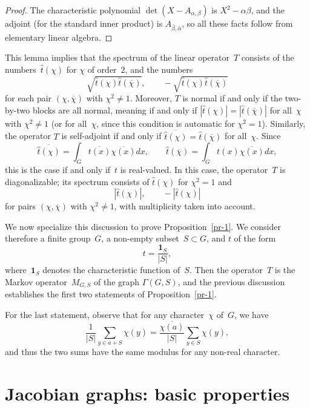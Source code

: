 \documentclass[12pt]{amsart}
\numberwithin{equation}{section}
\theoremstyle{plain}
\theoremstyle{remark}
\theoremstyle{definition}
\begin{document}
\begin{proof}
  The characteristic polynomial $\det(X-A_{\alpha,\beta})$ is
  $X^2-\alpha\beta$, and the adjoint (for the standard inner product) is
  $A_{\bar{\beta},\bar{\alpha}}$, so all these facts follow from
  elementary linear algebra.
\end{proof}

This lemma implies that the spectrum of the linear operator~$T$ consists
of the numbers~$\widehat{t}(\chi)$ for $\chi$ of order~$2$, and the
numbers
\[
  \sqrt{\widehat{t}(\chi)\widehat{t}(\overline{\chi})},\quad\quad
  -\sqrt{\widehat{t}(\chi)\widehat{t}(\overline{\chi})}
\]
for each pair $(\chi,\overline{\chi})$ with $\chi^2\not=1$.  Moreover,
$T$ is normal if and only if the two-by-two blocks are all normal, meaning
if and only if $ |\widehat{t}(\chi)|=|\widehat{t}(\overline{\chi})|$ for
all~$\chi$ with $\chi^2\not=1$ (or for all~$\chi$, since this condition
is automatic for $\chi^2=1$).
Similarly, the operator $T$ is self-adjoint if and only if
$\overline{\widehat{t}(\chi)}=\widehat{t}(\overline{\chi})$ for
all~$\chi$. Since
\[
  \overline{\widehat{t}(\chi)}=\int_G
  \overline{t(x)}\overline{\chi(x)}dx,\quad\quad
  \widehat{t}(\overline{\chi})=
  \int_Gt(x)\overline{\chi(x)}dx,
\]
this is the case if and only if~$t$ is real-valued. In this case, the
operator~$T$ is diagonalizable; its
spectrum consists of $\widehat{t}(\chi)$ for $\chi^2=1$ and
\[
  |\widehat{t}(\chi)|,\quad\quad - |\widehat{t}(\chi)|
\]
for pairs $(\chi,\overline{\chi})$ with $\chi^2\not=1$, with
multiplicity taken into account.

We now specialize this discussion to prove Proposition~\ref{pr-1}. We
consider therefore a finite group~$G$, a non-empty subset~$S\subset G$, and $t$ of the form
\[
  t=\frac{\mathbf 1_S}{|S|},
\]
where~$\mathbf 1_S$ denotes the characteristic function of~$S$. Then the
operator~$T$ is the Markov operator~$M_{G,S}$ of the graph
$\Gamma(G,S)$, and the previous discussion establishes the first two
statements of Proposition~\ref{pr-1}.

For the last statement, observe that for any character~$\chi$ of~$G$, we
have
\[
  \frac{1}{|S|} \sum_{y\in a+S}\chi(y)=
  \frac{\overline{\chi(a)}}{|S|}\sum_{y\in S}\chi(y),
\]
and thus the two sums have the same modulus for any non-real character.

\section{Jacobian graphs: basic properties}\label{sec-graphs}
\end{document}
